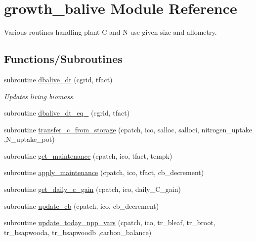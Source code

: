 \hypertarget{namespacegrowth__balive}{}\section{growth\+\_\+balive Module Reference}
\label{namespacegrowth__balive}


Various routines handling plant C and N use given size and allometry.  


\subsection*{Functions/\+Subroutines}
\begin{DoxyCompactItemize}
\item 
subroutine \hyperlink{namespacegrowth__balive_a7781ae229b2399c90d50858382665ee8}{dbalive\+\_\+dt} (cgrid, tfact)
\begin{DoxyCompactList}\small\item\em Updates living biomass. \end{DoxyCompactList}\item 
subroutine \hyperlink{namespacegrowth__balive_a15cba39e9b70b8dd6a1e2d0cbdd5cc2e}{dbalive\+\_\+dt\+\_\+eq\+\_} (cgrid, tfact)
\item 
subroutine \hyperlink{namespacegrowth__balive_add847b3fe5a1425632aea7c8a578d84f}{transfer\+\_\+c\+\_\+from\+\_\+storage} (cpatch, ico, salloc, salloci, nitrogen\+\_\+uptake                                                                                                                                                                                           ,N\+\_\+uptake\+\_\+pot)
\item 
subroutine \hyperlink{namespacegrowth__balive_ac2f667372e6f2a5fc7329466cc958a6c}{get\+\_\+maintenance} (cpatch, ico, tfact, tempk)
\item 
subroutine \hyperlink{namespacegrowth__balive_a692030d19fe1844dd9d9b676a9475e64}{apply\+\_\+maintenance} (cpatch, ico, tfact, cb\+\_\+decrement)
\item 
subroutine \hyperlink{namespacegrowth__balive_ad43c7e3fcb88db17077ed58aeab8fe2d}{get\+\_\+daily\+\_\+c\+\_\+gain} (cpatch, ico, daily\+\_\+\+C\+\_\+gain)
\item 
subroutine \hyperlink{namespacegrowth__balive_ac4ca7901eed6321044f171f6f1b8d7d6}{update\+\_\+cb} (cpatch, ico, cb\+\_\+decrement)
\item 
subroutine \hyperlink{namespacegrowth__balive_a2bc138f187a465304da86a27fb804f45}{update\+\_\+today\+\_\+npp\+\_\+vars} (cpatch, ico, tr\+\_\+bleaf, tr\+\_\+broot, tr\+\_\+bsapwooda, tr\+\_\+bsapwoodb                                                                                                                                       ,carbon\+\_\+balance)

\end{DoxyCompactItemize}
